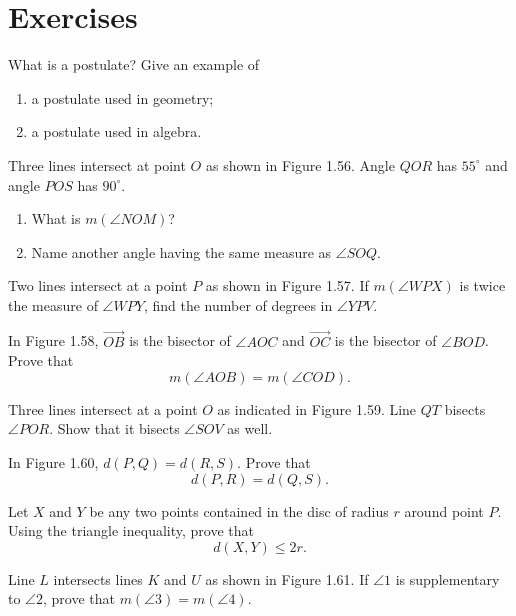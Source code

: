 \documentclass[12pt]{book} %
\begin{document}
\section*{Exercises}

\begin{ExerciseList}
	\Exercise What is a postulate? Give an example of
	\begin{enumerate}
		\item[(a)] a postulate used in geometry;
		\item[(b)] a postulate used in algebra.
	\end{enumerate}
	
	\Exercise Three lines intersect at point $O$ as shown in Figure 1.56. Angle $QOR$ has $55^\circ$ and angle $POS$ has $90^\circ$.
	
	
	\begin{enumerate}
		\item[(a)] What is $m(\angle NOM)$?
		\item[(b)] Name another angle having the same measure as $\angle SOQ$.
	\end{enumerate}
	
	\Exercise Two lines intersect at a point $P$ as shown in Figure 1.57. If $m(\angle WPX)$ is twice the measure of $\angle WPY$, find the number of degrees in $\angle YPV$.
	
	
	\Exercise In Figure 1.58, $\overrightarrow{OB}$ is the bisector of $\angle AOC$ and $\overrightarrow{OC}$ is the bisector of $\angle BOD$. Prove that
	\[
	m(\angle AOB)=m(\angle COD).
	\]
	
	
	\Exercise Three lines intersect at a point $O$ as indicated in Figure 1.59. Line $QT$ bisects $\angle POR$. Show that it bisects $\angle SOV$ as well.
	
	
	\Exercise In Figure 1.60, $d(P,Q)=d(R,S)$. Prove that
	\[
	d(P,R)=d(Q,S).
	\]
	
	
	\Exercise Let $X$ and $Y$ be any two points contained in the disc of radius $r$ around point $P$. Using the triangle inequality, prove that
	\[
	d(X,Y)\le 2r.
	\]
	
	\Exercise Line $L$ intersects lines $K$ and $U$ as shown in Figure 1.61. If $\angle 1$ is supplementary to $\angle 2$, prove that $m(\angle 3)=m(\angle 4)$.
	

\end{ExerciseList}
\end{document}
